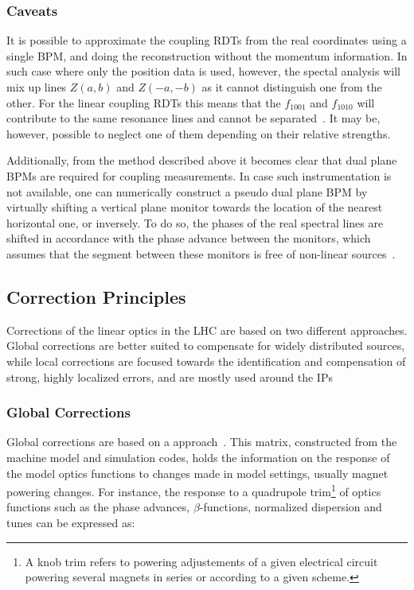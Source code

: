\subsubsection*{Caveats}

It is possible to approximate the coupling RDTs from the real coordinates using a single BPM, and doing the reconstruction without the momentum information.
In such case where only the position data is used, however, the spectal analysis will mix up lines \(Z(a,b)\) and \(Z(-a, -b)\) as it cannot distinguish one from the other.
For the linear coupling RDTs this means that the \(f_{1001}\) and \(f_{1010}\) will contribute to the same resonance lines and cannot be separated~\cite{PHD:Persson}.
It may be, however, possible to neglect one of them depending on their relative strengths.

Additionally, from the method described above it becomes clear that dual plane BPMs are required for coupling measurements.
In case such instrumentation is not available, one can numerically construct a pseudo dual plane BPM by virtually shifting a vertical plane monitor towards the location of the nearest horizontal one, or inversely.
To do so, the phases of the real spectral lines are shifted in accordance with the phase advance between the monitors, which assumes that the segment between these monitors is free of non-linear sources~\cite{PHD:Vanbavinckhove}.

\subsection{Correction Principles}
\label{subsection:correction_principles}

Corrections of the linear optics in the LHC are based on two different approaches.
Global corrections are better suited to compensate for widely distributed sources, while local corrections are focused towards the identification and compensation of strong, highly localized errors, and are mostly used around the IPs

\subsubsection*{Global Corrections}

Global corrections are based on a  approach~\cite{PHD:Vanbavinckhove,EPAC:Tomas:Procedures_Accuracy_Estimates_Beta_Beat_Correction_LHC}.
This matrix, constructed from the machine model and simulation codes, holds the information on the response of the model optics functions to changes made in model settings, usually magnet powering changes.
For instance, the response to a quadrupole  trim\footnote{A knob trim refers to powering adjustements of a given electrical circuit powering several magnets in series or according to a given scheme.} of optics functions such as the phase advances, \(\beta\)-functions, normalized dispersion and tunes can be expressed as:

